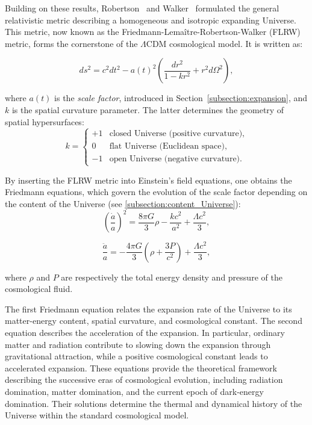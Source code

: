 \documentclass[../../thesis.tex]{subfiles}
\begin{document}
Building on these results, Robertson~\cite{robertson1935} and Walker~\cite{walker1936} formulated the general relativistic metric describing a homogeneous and isotropic expanding Universe. This metric, now known as the Friedmann-Lemaître-Robertson-Walker (FLRW) metric, forms the cornerstone of the $\Lambda$CDM cosmological model. It is written as:

\begin{equation}
    ds^2 = c^2 dt^2 - a(t)^2 \left( \frac{dr^2}{1 - kr^2} + r^2 d\Omega^2 \right),
\end{equation}

where $a(t)$ is the \emph{scale factor}, introduced in Section~\ref{subsection:expansion}, and $k$ is the spatial curvature parameter. The latter determines the geometry of spatial hypersurfaces:
\[
k =
\begin{cases}
+1 & \text{closed Universe (positive curvature)}, \\
0 & \text{flat Universe (Euclidean space)}, \\
-1 & \text{open Universe (negative curvature)}.
\end{cases}
\]

By inserting the FLRW metric into Einstein's field equations, one obtains the Friedmann equations, which govern the evolution of the scale factor depending on the content of the Universe (see \ref{subsection:content_Universe}):
\begin{equation}
    \left( \frac{\dot{a}}{a} \right)^2
    =
    \frac{8\pi G}{3}\rho
    - \frac{kc^2}{a^2}
    + \frac{\Lambda c^2}{3},
\end{equation}

\begin{equation}
    \frac{\ddot{a}}{a}
    =
    -\frac{4\pi G}{3}
    \left(
    \rho + \frac{3P}{c^2}
    \right)
    + \frac{\Lambda c^2}{3},
\end{equation}

where $\rho$ and $P$ are respectively the total energy density and pressure of the cosmological fluid.

The first Friedmann equation relates the expansion rate of the Universe to its matter-energy content, spatial curvature, and cosmological constant. The second equation describes the acceleration of the expansion. In particular, ordinary matter and radiation contribute to slowing down the expansion through gravitational attraction, while a positive cosmological constant leads to accelerated expansion. These equations provide the theoretical framework describing the successive eras of cosmological evolution, including radiation domination, matter domination, and the current epoch of dark-energy domination. Their solutions determine the thermal and dynamical history of the Universe within the standard cosmological model.
\end{document}
